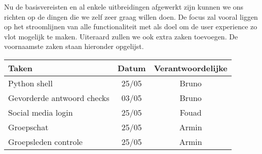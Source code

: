 Nu de basisvereisten en al enkele uitbreidingen afgewerkt zijn kunnen we ons richten op de dingen die we zelf zeer graag willen doen.
De focus zal vooral liggen op het stroomlijnen van alle functionaliteit met als doel om de user experience zo vlot mogelijk te maken.
Uiteraard zullen we ook extra zaken toevoegen. De voornaamste zaken staan hieronder opgelijst.
\begin{tabular}{| l | c | c |}
    \hline
    Taken               &   Datum   &   Verantwoordelijke   \\
    \hline \hline
    Python shell        &   25/05   &   Bruno               \\
    Gevorderde antwoord checks &   03/05   &   Bruno        \\
    Social media login  &   25/05   &   Fouad               \\
    Groepschat          &   25/05   &   Armin               \\
    Groepsleden controle&   25/05   &   Armin               \\
    \hline
\end{tabular}
